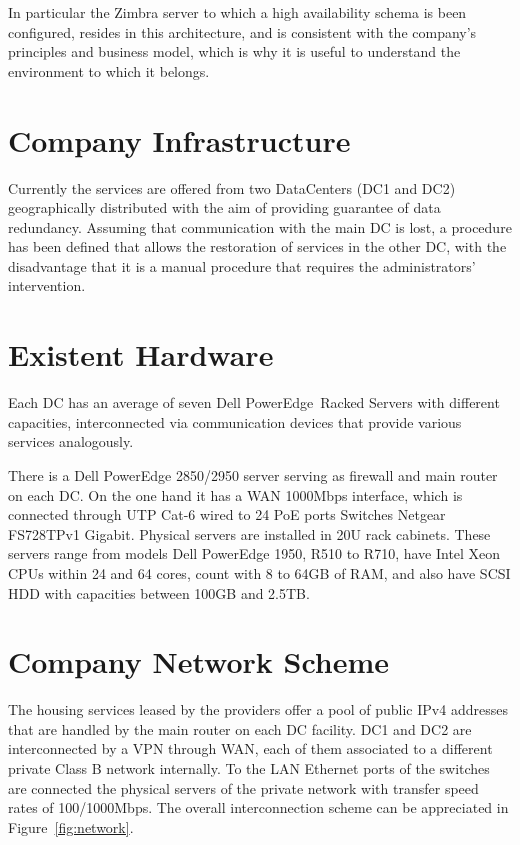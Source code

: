 \documentclass[a4paper, 12pt]{book}
\begin{document}
\noindent In particular the Zimbra server to which a high availability schema is been configured, resides in this architecture, and is consistent with the company's principles and business model, which is why it is useful to understand the environment to which it belongs.


\section{Company Infrastructure}
\label{sec:infrastructure}

Currently the services are offered from two DataCenters (DC1 and DC2) geographically distributed with the aim of providing guarantee of data redundancy. Assuming that communication with the main DC is lost, a procedure has been defined that allows the restoration of services in the other DC, with the disadvantage that it is a manual procedure that requires the  administrators' intervention.

\section{Existent Hardware}
\label{sec:hardware}

Each DC has an average of seven Dell PowerEdge\texttrademark \ Racked Servers with different capacities, interconnected via communication devices that provide various services analogously.\bigskip

\noindent There is a Dell PowerEdge 2850/2950 server serving as firewall and main router on each DC. On the one hand it has a WAN 1000Mbps interface, which is connected through UTP Cat-6 wired to 24 PoE ports Switches Netgear FS728TPv1 Gigabit. Physical servers are installed in 20U rack cabinets. These servers range from models Dell PowerEdge 1950, R510 to R710, have Intel Xeon CPUs within 24 and 64 cores, count with 8 to 64GB of RAM, and also have SCSI HDD with capacities between 100GB and 2.5TB.


\section{Company Network Scheme}
\label{sec:networkscheme}

The housing services leased by the providers offer a pool of public IPv4 addresses that are handled by the main router on each DC facility. DC1 and DC2 are interconnected by a VPN through WAN, each of them associated to a different private Class B network internally. To the LAN Ethernet ports of the switches are connected the physical servers of the private network with transfer speed rates of 100/1000Mbps. The overall interconnection scheme can be appreciated in Figure~\ref{fig:network}.
\end{document}

